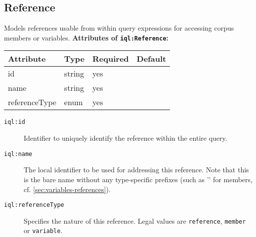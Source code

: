 \documentclass[11pt,a4paper,portrait]{article}
\newcommand{\iqlns}{iql:}
\newcommand{\iqlType}[1]{\texttt{\iqlns#1}}
\newcommand{\desc}[1]{\noindent#1\newline\medskip}
\newenvironment{attributes}[1]{
\noindent\textbf{Attributes of #1:}\newline\medskip
\begin{tabular}{|p{0.3\textwidth}|p{0.20\textwidth}|p{0.20\textwidth}|p{0.17\textwidth}|}
	\hline
	\textbf{Attribute} & \textbf{Type} & \textbf{Required} & \textbf{Default} \\ 
	\hline
	\hline
}{
\end{tabular}
}
\newcommand{\attribute}[4]{
	#1 & #2 & #3 & #4 \\
	\hline
}
\begin{document}
\subsection{Reference}
\label{sec:json-ld-reference}
\desc{Models references usable from within query expressions for accessing corpus members or variables.}
\begin{attributes}{\iqlType{Reference}}
	\attribute{id}{string}{yes}{}
	\attribute{name}{string}{yes}{}
	\attribute{referenceType}{enum}{yes}{}
\end{attributes}
\begin{description}
	\item[\iqlType{id}] Identifier to uniquely identify the reference within the entire query.
	\item[\iqlType{name}] The local identifier to be used for addressing this reference. Note that this is the bare name without any type-specific prefixes (such as '\textdollar' for members, cf. \cref{sec:variables-references}).
	\item[\iqlType{referenceType}] Specifies the nature of this reference. Legal values are \texttt{reference}, \texttt{member} or \texttt{variable}.
\end{description}

\end{document}
